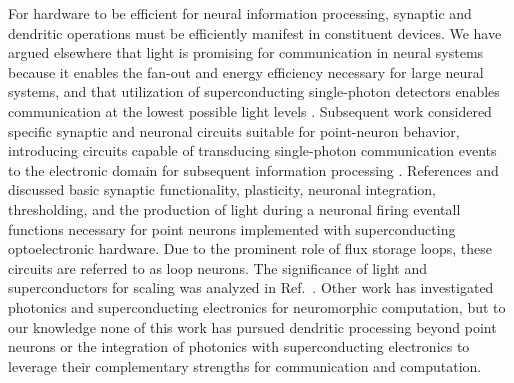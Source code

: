 \documentclass[twocolumn]{article}
\newcommand{\onlinecite}[1]{\hspace{-1 ex} \nocite{#1}\citenum{#1}}
\begin{document}
For hardware to be efficient for neural information processing, synaptic and dendritic operations must be efficiently manifest in constituent devices. We have argued elsewhere that light is promising for communication in neural systems because it enables the fan-out and energy efficiency necessary for large neural systems, and that utilization of superconducting single-photon detectors enables communication at the lowest possible light levels \cite{shbu2017}. Subsequent work considered specific synaptic and neuronal circuits suitable for point-neuron behavior, introducing circuits capable of transducing single-photon communication events to the electronic domain for subsequent information processing \cite{sh2018,sh2018_full}. References \onlinecite{sh2018} and \onlinecite{sh2018_full} discussed basic synaptic functionality, plasticity, neuronal integration, thresholding, and the production of light during a neuronal firing event\textemdash all functions necessary for point neurons implemented with superconducting optoelectronic hardware. Due to the prominent role of flux storage loops, these circuits are referred to as loop neurons. The significance of light and superconductors for scaling was analyzed in Ref.\,\onlinecite{sh2018_ICRC}. Other work has investigated photonics \cite{nash2013,tafe2017,prsh2017,shha2016,chsa2018} and superconducting electronics \cite{hias2007,crsc2010,ru2016,sele2017,scdo2018,kafu2018} for neuromorphic computation, but to our knowledge none of this work has pursued dendritic processing beyond point neurons or the integration of photonics with superconducting electronics to leverage their complementary strengths for communication and computation. 
\end{document}
